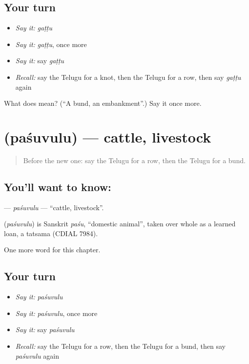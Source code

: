 \subsection*{Your turn}
\begin{itemize}
\raggedright
  \item \emph{Say it:} \emph{gaṭṭu}
  \item \emph{Say it:} \emph{gaṭṭu}, once more
  \item \emph{Say it:} say \emph{gaṭṭu}
  \item \emph{Recall:} say the Telugu for a knot, then the Telugu for a row, then say \emph{gaṭṭu} again
\end{itemize}

\begin{tcolorbox}[breakable,colback=teal!4,colframe=teal!35!black,title={Before you move on}]
What does  mean? (\textquotedblleft{}A bund, an embankment\textquotedblright{}.) Say it once more.
\end{tcolorbox}
\section[\texorpdfstring{\te{పశువులు} (paśuvulu)}{పశువులు (paśuvulu)}]{ (paśuvulu) — cattle, livestock}

\label{lesson:TE-C309-pasuvulu}



\begin{quote}
Before the new one: say the Telugu for a row, then the Telugu for a bund.
\end{quote}

\subsection*{You'll want to know: }
\textbf{} — \emph{paśuvulu} — \textquotedblleft{}cattle, livestock\textquotedblright{}.

\begin{cousinweb}
\textbf{} (\emph{paśuvulu}) is Sanskrit \emph{paśu}, \textquotedblleft{}domestic animal\textquotedblright{}, taken over whole as a learned loan, a tatsama (CDIAL 7984).
\end{cousinweb}

\begin{grammarlens}[title={What you've built}]
One more word for this chapter.
\end{grammarlens}

\subsection*{Your turn}
\begin{itemize}
\raggedright
  \item \emph{Say it:} \emph{paśuvulu}
  \item \emph{Say it:} \emph{paśuvulu}, once more
  \item \emph{Say it:} say \emph{paśuvulu}
  \item \emph{Recall:} say the Telugu for a row, then the Telugu for a bund, then say \emph{paśuvulu} again
\end{itemize}

